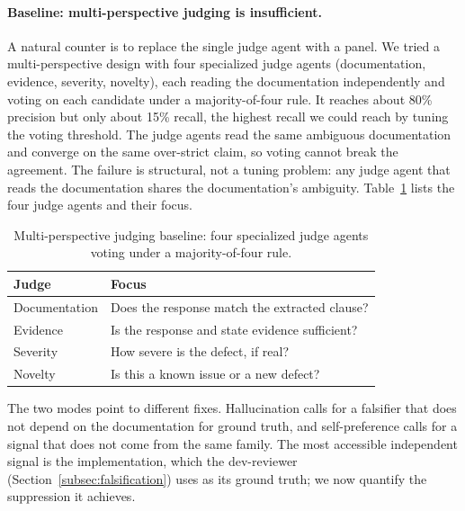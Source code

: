 \documentclass[sigconf]{acmart}
\begin{document}
\paragraph{Baseline: multi-perspective judging is insufficient.}
A natural counter is to replace the single judge agent with a panel. We tried a multi-perspective design with four specialized judge agents (documentation, evidence, severity, novelty), each reading the documentation independently and voting on each candidate under a majority-of-four rule. It reaches about 80\% precision but only about 15\% recall, the highest recall we could reach by tuning the voting threshold. The judge agents read the same ambiguous documentation and converge on the same over-strict claim, so voting cannot break the agreement. The failure is structural, not a tuning problem: any judge agent that reads the documentation shares the documentation's ambiguity. Table~\ref{tab:multipersp} lists the four judge agents and their focus.

\begin{table}[t]
\caption{Multi-perspective judging baseline: four specialized judge agents voting under a majority-of-four rule.}
\label{tab:multipersp}
\small
\begin{tabular}{@{}lp{}@{}}
\toprule
Judge & Focus \\
\midrule
Documentation & Does the response match the extracted clause? \\
Evidence & Is the response and state evidence sufficient? \\
Severity & How severe is the defect, if real? \\
Novelty & Is this a known issue or a new defect? \\
\bottomrule
\end{tabular}
\end{table}

The two modes point to different fixes. Hallucination calls for a falsifier that does not depend on the documentation for ground truth, and self-preference calls for a signal that does not come from the same family. The most accessible independent signal is the implementation, which the dev-reviewer (Section~\ref{subsec:falsification}) uses as its ground truth; we now quantify the suppression it achieves.
\end{document}
